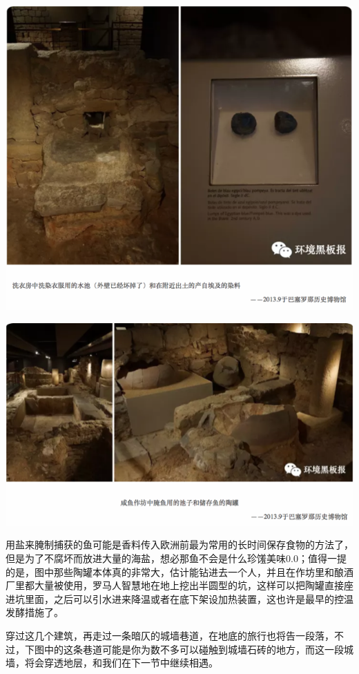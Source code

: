 \documentclass[
]{book}
\begin{document}
\includegraphics[width=8.33in]{images/xt16}

\includegraphics[width=8.33in]{images/xt17}

用盐来腌制捕获的鱼可能是香料传入欧洲前最为常用的长时间保存食物的方法了，但是为了不腐坏而放进大量的海盐，想必那鱼不会是什么珍馐美味0.0；值得一提的是，图中那些陶罐本体真的非常大，估计能钻进去一个人，并且在作坊里和酿酒厂里都大量被使用，罗马人智慧地在地上挖出半圆型的坑，这样可以把陶罐直接座进坑里面，之后可以引水进来降温或者在底下架设加热装置，这也许是最早的控温发酵措施了。

穿过这几个建筑，再走过一条暗仄的城墙巷道，在地底的旅行也将告一段落，不过，下图中的这条巷道可能是你为数不多可以碰触到城墙石砖的地方，而这一段城墙，将会穿透地层，和我们在下一节中继续相遇。
\end{document}
